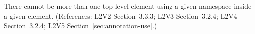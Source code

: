 There cannot be more than one top-level element using a given namespace
inside a given  element.  (References: L2V2 Section~3.3.3;
L2V3 Section~3.2.4; L2V4 Section~3.2.4; L2V5 Section~\ref{sec:annotation-use}.)

